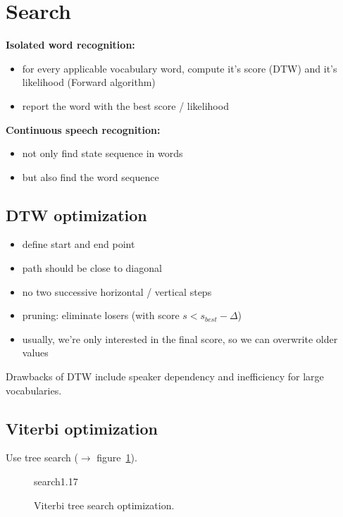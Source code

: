 \documentclass[11pt]{article}
\begin{document}
\newpage

\section{Search}

\textbf{Isolated word recognition:}
\begin{itemize}
    \item for every applicable vocabulary word, compute it's score (DTW) and it's likelihood (Forward algorithm)
    \item report the word with the best score / likelihood
\end{itemize}

\vspace{5pt}

\textbf{Continuous speech recognition:}
\begin{itemize}
    \item not only find state sequence in words
    \item but also find the word sequence
\end{itemize}

\vspace{5pt}

\subsection{DTW optimization}
\begin{itemize}
    \item define start and end point
    \item path should be close to diagonal
    \item no two successive horizontal / vertical steps
    \item pruning: eliminate losers (with score $s < s_{best} - \Delta$)
    \item usually, we're only interested in the final score, so we can overwrite older values
\end{itemize}

Drawbacks of DTW include speaker dependency and inefficiency for large vocabularies.

\subsection{Viterbi optimization}
Use tree search ($\to$ figure~\ref{fig:viterbiTreeSearchOptimization}).
\begin{figure}[htb]
    \begin{minipage}{\linewidth}
        \vspace{5cm}
        \hfill \scriptsize search1.17
    \end{minipage}
    \caption{\label{fig:viterbiTreeSearchOptimization} Viterbi tree search optimization.}
\end{figure}
\end{document}

